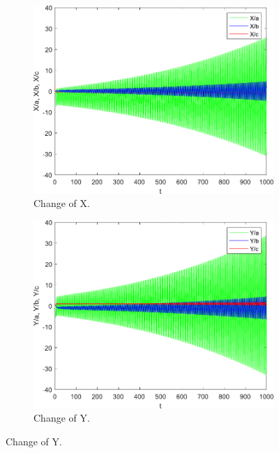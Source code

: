 \begin{figure}[H]
        \centering
        \begin{subfigure}[b]{0.475\textwidth}
            \centering
            \includegraphics[scale=0.45]{files/dX_084.pdf}
            \caption{Change of X.}    
            \label{fig:dX_084}
        \end{subfigure}
        \hfill
        \begin{subfigure}[b]{0.475\textwidth}  
            \centering 
            \includegraphics[scale=0.45]{files/dY_084.pdf}
            \caption{Change of Y.}  
            \label{fig:dY_084}
        \end{subfigure}

\end{figure}
